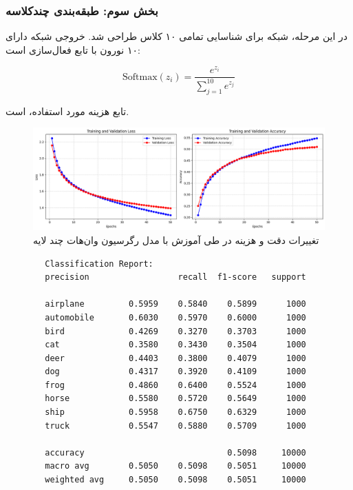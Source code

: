 	\subsubsection{بخش سوم: طبقه‌بندی چندکلاسه}
	
	در این مرحله، شبکه برای شناسایی تمامی ۱۰ کلاس  طراحی شد. خروجی شبکه دارای ۱۰ نورون با تابع فعال‌سازی  است:
	
	\[
	\text{Softmax}(z_i) = \frac{e^{z_i}}{\sum_{j=1}^{10} e^{z_j}}
	\]
	
	تابع هزینه مورد استفاده،  است.
	
		
	\begin{figure}[h]
		\centering
		\includegraphics[width=0.7\linewidth]{images/task3-1}
		\caption{تغییرات دقت و هزینه در طی آموزش با مدل رگرسیون وان‌هات چند لایه}
		\label{fig:task3-1}
	\end{figure}
	
	
	
	\begin{lstlisting}
		Classification Report:
		precision                  recall  f1-score   support
		
		airplane         0.5959    0.5840    0.5899      1000
		automobile       0.6030    0.5970    0.6000      1000
		bird             0.4269    0.3270    0.3703      1000
		cat              0.3580    0.3430    0.3504      1000
		deer             0.4403    0.3800    0.4079      1000
		dog              0.4317    0.3920    0.4109      1000
		frog             0.4860    0.6400    0.5524      1000
		horse            0.5580    0.5720    0.5649      1000
		ship             0.5958    0.6750    0.6329      1000
		truck            0.5547    0.5880    0.5709      1000
		
		accuracy                             0.5098     10000
		macro avg        0.5050    0.5098    0.5051     10000
		weighted avg     0.5050    0.5098    0.5051     10000
		
	\end{lstlisting}
	
